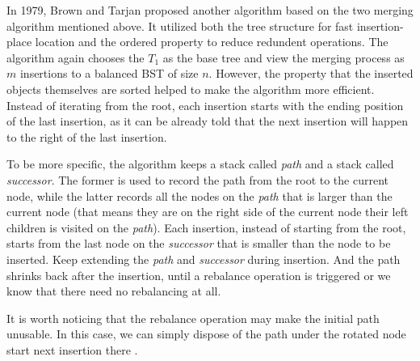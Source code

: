 \documentclass[12pt]{article}
\begin{document}
In 1979, Brown and Tarjan proposed another algorithm based on the two merging algorithm mentioned above. It utilized both the tree structure for fast insertion-place location and the ordered property to reduce redundent operations. The algorithm again chooses the $T_1$ as the base tree and view the merging process as $m$ insertions to a balanced BST of size $n$. However, the property that the inserted objects themselves are sorted helped to make the algorithm more efficient. Instead of iterating from the root, each insertion starts with the ending position of the last insertion, as it can be already told that the next insertion will happen to the right of the last insertion. 

To be more specific, the algorithm keeps a stack called \textit{path} and a stack called \textit{successor}. The former is used to record the path from the root to the current node, while the latter records all the nodes on the \textit{path} that is larger than the current node (that means they are on the right side of the current node their left children is visited on the \textit{path}). Each insertion, instead of starting from the root, starts from the last node on the \textit{successor} that is smaller than the node to be inserted. Keep extending the \textit{path} and \textit{successor} during insertion. And the path shrinks back after the insertion, until a rebalance operation is triggered or we know that there need no rebalancing at all.

It is worth noticing that the rebalance operation may make the initial path unusable. In this case, we can simply dispose of the path under the rotated node start next insertion there \cite{brown1979fast}. 
\end{document}
